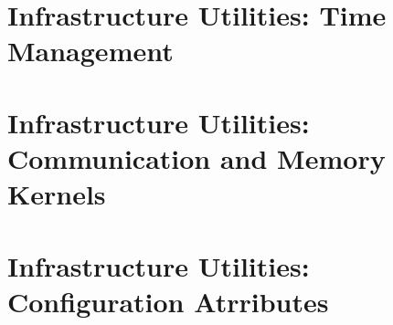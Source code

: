 \documentclass[english]{article}
\newcommand{\shortname}{GR}
\begin{document}
\part{Infrastructure Utilities: Time Management}
\label{part:Infrastructure_Utilities:_Time_Management}

\setcounter{section}{0}
\renewcommand{\thesection}{\shortname\arabic{section}}
\renewcommand{\thesubsection}{\shortname\arabic{section}.\arabic{subsection}}
\renewcommand{\thesubsubsection}{\shortname\arabic{section}.\arabic{subsection}.\arabic{subsubsection}}


\newpage
\begin{htmlonly}
\end{htmlonly}
\part{Infrastructure Utilities: Communication and Memory Kernels}
\label{part:Infrastructure_Utilities:_Communication_and_Memory_Kernels}

\setcounter{section}{0}
\renewcommand{\thesection}{\shortname\arabic{section}}
\renewcommand{\thesubsection}{\shortname\arabic{section}.\arabic{subsection}}
\renewcommand{\thesubsubsection}{\shortname\arabic{section}.\arabic{subsection}.\arabic{subsubsection}}



\newpage
\begin{htmlonly}
\end{htmlonly}
\part{Infrastructure Utilities: Configuration Atrributes}
\label{part:Infrastructure_Utilities:_Configuration_Attributes}

\setcounter{section}{0}
\renewcommand{\thesection}{\shortname\arabic{section}}
\renewcommand{\thesubsection}{\shortname\arabic{section}.\arabic{subsection}}
\renewcommand{\thesubsubsection}{\shortname\arabic{section}.\arabic{subsection}.\arabic{subsubsection}}
\end{document}

